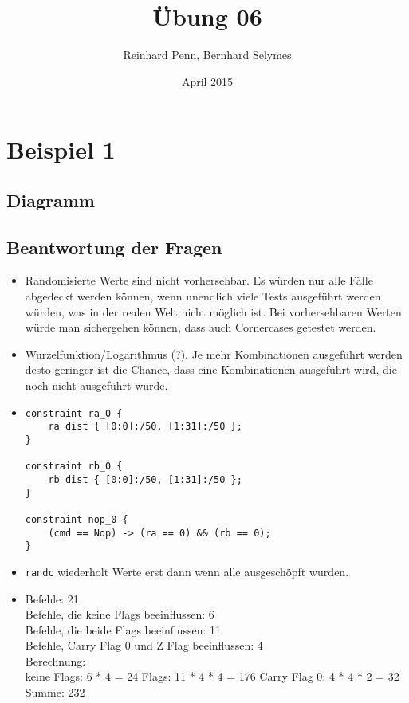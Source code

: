 \documentclass[12pt,a4paper]{article}
\begin{document}
\title{Übung 06}
\author{Reinhard Penn, Bernhard Selymes}
\date{April 2015}

\normalsize


\newcommand{\Uebung}{Random}
\newcommand{\srcpath}{../../src}
\newcommand{\simpath}{../../sim}



\section{Beispiel 1}

\subsection{Diagramm}


\subsection{Beantwortung der Fragen}

\begin{itemize}
	\item Randomisierte Werte sind nicht vorhersehbar. Es würden nur alle Fälle abgedeckt werden können, wenn unendlich viele Tests ausgeführt werden würden, was in der realen Welt nicht möglich ist.
	Bei vorhersehbaren Werten würde man sichergehen können, dass auch Cornercases getestet werden.
	\item Wurzelfunktion/Logarithmus (?). Je mehr Kombinationen ausgeführt werden desto geringer ist die Chance, dass eine Kombinationen ausgeführt wird, die noch nicht ausgeführt wurde.
	\item
				\begin{lstlisting}[numbers=none]
constraint ra_0 {
	ra dist { [0:0]:/50, [1:31]:/50 };
}
	
constraint rb_0 {
	rb dist { [0:0]:/50, [1:31]:/50 };
}

constraint nop_0 {
	(cmd == Nop) -> (ra == 0) && (rb == 0);
}
				\end{lstlisting}
		
	\item \texttt{randc} wiederholt Werte erst dann wenn alle ausgeschöpft wurden.
	\item Befehle: 21\\
				Befehle, die keine Flags beeinflussen: 6\\
				Befehle, die beide Flags beeinflussen: 11\\
				Befehle, Carry Flag 0 und Z Flag beeinflussen: 4\\
				
				Berechnung:\\
				keine Flags: 6 * 4 = 24
				Flags: 11 * 4 * 4 = 176
				Carry Flag 0: 4 * 4 * 2 = 32
				Summe: 232
				
\end{itemize}
\end{document}
